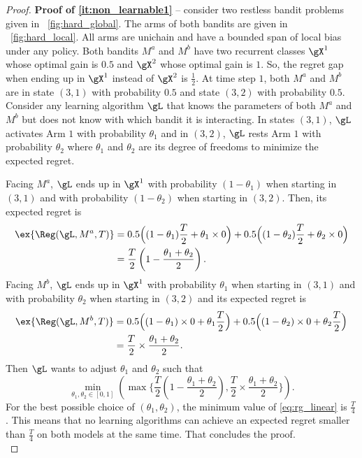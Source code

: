 \begin{proof}
    \textbf{Proof of \ref{it:non_learnable1}} -- consider two restless bandit problems given in \figurename~\ref{fig:hard_global}.
    The arms of both bandits are given in \figurename~\ref{fig:hard_local}.
    All arms are unichain and have a bounded span of local bias under any policy.
    Both bandits $M^a$ and $M^b$ have two recurrent classes $\gX^1$ whose optimal gain is $0.5$ and $\gX^2$ whose optimal gain is $1$.
    So, the regret gap when ending up in $\gX^1$ instead of $\gX^2$ is $\frac12$.
    At time step $1$, both $M^a$ and $M^b$ are in state $(3,1)$ with probability $0.5$ and state $(3,2)$ with probability $0.5$.
    Consider any learning algorithm $\gL$ that knows the parameters of both $M^a$ and $M^b$ but does not know with which bandit it is interacting.
    In states $(3,1)$, $\gL$ activates Arm $1$ with probability $\theta_1$ and in $(3,2)$, $\gL$  rests Arm $1$ with probability $\theta_2$ where $\theta_1$ and $\theta_2$ are its degree of freedoms to minimize the expected regret.

    Facing $M^a$, $\gL$ ends up in $\gX^1$ with probability $(1-\theta_1)$ when starting in $(3,1)$ and with probability $(1-\theta_2)$ when starting in $(3,2)$.
    Then, its expected regret is
    \begin{align*}
        \ex{\Reg(\gL,M^a,T)}
        &=0.5\Bigl((1-\theta_1)\frac{T}2 +\theta_1\times 0\Bigr) +0.5\Bigl((1-\theta_2)\frac{T}2 +\theta_2\times 0\Bigr)\\
        &=\frac{T}2\left(1-\frac{\theta_1+\theta_2}2\right).
    \end{align*}
    Facing $M^b$, $\gL$ ends up in $\gX^1$ with probability $\theta_1$ when starting in $(3,1)$ and with probability $\theta_2$ when starting in $(3,2)$ and its expected regret is
    \begin{align*}
        \ex{\Reg(\gL,M^b,T)}
        &=0.5\Bigl((1-\theta_1)\times 0 +\theta_1\frac{T}2\Bigr) +0.5\Bigl((1-\theta_2)\times 0 +\theta_2\frac{T}2\Bigr)\\
        &=\frac{T}2\times\frac{\theta_1+\theta_2}2.
    \end{align*}
    Then $\gL$ wants to adjust $\theta_1$ and $\theta_2$ such that
    \begin{equation}
        \label{eq:rg_linear}
        \min_{\theta_1,\theta_2\in[0,1]}\left(\max\biggl\{\frac{T}2\left(1-\frac{\theta_1+\theta_2}2\right), \frac{T}2\times\frac{\theta_1+\theta_2}2\biggr\}\right).
    \end{equation}
    For the best possible choice of $(\theta_1,\theta_2)$, the minimum value of \eqref{eq:rg_linear} is $\displaystyle\frac{T}4$.
    This means that no learning algorithms can achieve an expected regret smaller than $\frac{T}4$ on both models at the same time.
    That concludes the proof.
    \medskip \\



\end{proof}
